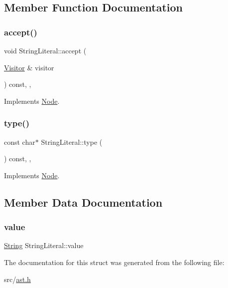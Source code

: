 \subsection{Member Function Documentation}
\mbox{\label{struct_string_literal_a796470cf5573384c12d62520728dea26}} 
\subsubsection{\texorpdfstring{accept()}{accept()}}
{\footnotesize\ttfamily void String\+Literal\+::accept (\begin{DoxyParamCaption}\item[{\hyperlink{struct_visitor}{Visitor} \&}]{visitor }\end{DoxyParamCaption}) const\hspace{0.3cm}{\ttfamily [inline]}, {\ttfamily [override]}, {\ttfamily [virtual]}}



Implements \hyperlink{struct_node_a10bd7af968140bbf5fa461298a969c71}{Node}.

\mbox{\label{struct_string_literal_ad9f83f67d287ea9d871a39672a3e64a9}} 
\subsubsection{\texorpdfstring{type()}{type()}}
{\footnotesize\ttfamily const char$\ast$ String\+Literal\+::type (\begin{DoxyParamCaption}{ }\end{DoxyParamCaption}) const\hspace{0.3cm}{\ttfamily [inline]}, {\ttfamily [override]}, {\ttfamily [virtual]}}



Implements \hyperlink{struct_node_a82f29420d0a38efcc370352528e94e9b}{Node}.



\subsection{Member Data Documentation}
\mbox{\label{struct_string_literal_afead14d45a2a651fb05695fd0358f41b}} 
\subsubsection{\texorpdfstring{value}{value}}
{\footnotesize\ttfamily \hyperlink{struct_string}{String} String\+Literal\+::value}



The documentation for this struct was generated from the following file\+:\begin{DoxyCompactItemize}
\item 
src/\hyperlink{ast_8h}{ast.\+h}\end{DoxyCompactItemize}
